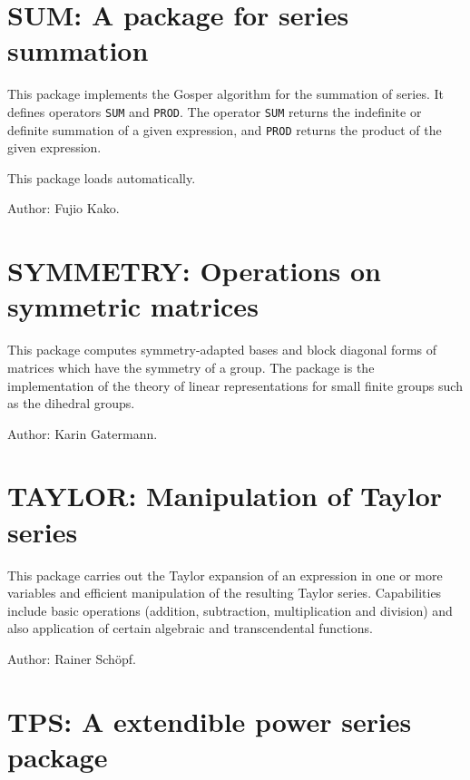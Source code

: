 \newpage

\section{SUM: A package for series summation} 
\hypertarget{operator:SUM}{}
\hypertarget{operator:PROD}{}

This package implements the Gosper algorithm for the summation of series.
It defines operators {\tt SUM} and {\tt PROD}.  The operator {\tt SUM}
returns the indefinite or definite summation of a given expression, and
{\tt PROD} returns the product of the given expression.

This package loads automatically.

Author: Fujio Kako.



\newpage

\section{SYMMETRY: Operations on symmetric matrices} 

This package computes symmetry-adapted bases and block diagonal forms of
matrices which have the symmetry of a group.  The package is the
implementation of the theory of linear representations for small finite
groups such as the dihedral groups.

Author: Karin Gatermann.



\newpage

\section{TAYLOR: Manipulation of Taylor series}

 

This package carries out the Taylor expansion of an expression in one or
more variables and efficient manipulation of the resulting Taylor series.
Capabilities include basic operations (addition, subtraction,
multiplication and division) and also application of certain algebraic and
transcendental functions.

Author: Rainer Sch\"opf.



\newpage

\section{TPS: A extendible power series package} 

